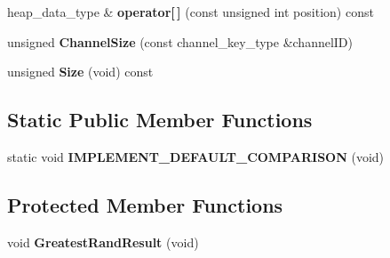 \begin{DoxyCompactItemize}
\item 
\hypertarget{class_data_structures_1_1_ordered_channel_heap_a538d385a1eeaeee648511be50d93b88f}{heap\-\_\-data\-\_\-type \& {\bfseries operator\mbox{[}$\,$\mbox{]}} (const unsigned int position) const }\label{class_data_structures_1_1_ordered_channel_heap_a538d385a1eeaeee648511be50d93b88f}

\item 
\hypertarget{class_data_structures_1_1_ordered_channel_heap_a67f40384fe67108550b6152144b207dc}{unsigned {\bfseries Channel\-Size} (const channel\-\_\-key\-\_\-type \&channel\-I\-D)}\label{class_data_structures_1_1_ordered_channel_heap_a67f40384fe67108550b6152144b207dc}

\item 
\hypertarget{class_data_structures_1_1_ordered_channel_heap_af8a9a0b891209e681e13d293b0fe3149}{unsigned {\bfseries Size} (void) const }\label{class_data_structures_1_1_ordered_channel_heap_af8a9a0b891209e681e13d293b0fe3149}

\end{DoxyCompactItemize}
\subsection*{Static Public Member Functions}
\begin{DoxyCompactItemize}
\item 
\hypertarget{class_data_structures_1_1_ordered_channel_heap_aed73f07f296769d86f0373f9cd2ede2d}{static void {\bfseries I\-M\-P\-L\-E\-M\-E\-N\-T\-\_\-\-D\-E\-F\-A\-U\-L\-T\-\_\-\-C\-O\-M\-P\-A\-R\-I\-S\-O\-N} (void)}\label{class_data_structures_1_1_ordered_channel_heap_aed73f07f296769d86f0373f9cd2ede2d}

\end{DoxyCompactItemize}
\subsection*{Protected Member Functions}
\begin{DoxyCompactItemize}
\item 
\hypertarget{class_data_structures_1_1_ordered_channel_heap_a9e92458dd3bf27589f621ae4cfac76da}{void {\bfseries Greatest\-Rand\-Result} (void)}\label{class_data_structures_1_1_ordered_channel_heap_a9e92458dd3bf27589f621ae4cfac76da}

\end{DoxyCompactItemize}
